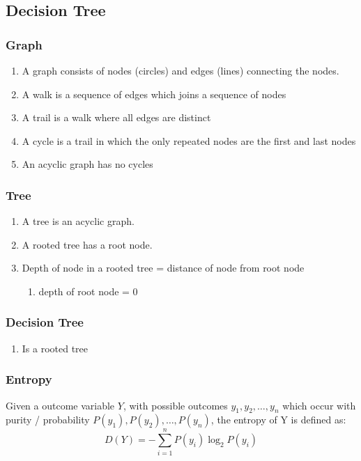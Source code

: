 \documentclass[../../dsa1101_notes.Rtex]{subfiles}\usepackage[]{graphicx}\usepackage[]{color}
\begin{document}
\subsection{Decision Tree}
\subsubsection{Graph}
\begin{enumerate}
	\item A graph consists of nodes (circles) and edges (lines) connecting the nodes.
	\item A walk is a sequence of edges which joins a sequence of nodes
	\item A trail is a walk where all edges are distinct
	\item A cycle is a trail in which the only repeated nodes are the first and last nodes
	\item An acyclic graph has no cycles
\end{enumerate}

\subsubsection{Tree}
\begin{enumerate}
	\item A tree is an acyclic graph.
	\item A rooted tree has a root node.
	\item Depth of node in a rooted tree = distance of node from root node
	\begin{enumerate}
	    \item depth of root node = 0
	\end{enumerate}
\end{enumerate}

\subsubsection{Decision Tree}
\begin{enumerate}
    \item Is a rooted tree
\end{enumerate}

\subsubsection{Entropy}
Given a outcome variable \(Y\), with possible outcomes \(y_1, y_2, \ldots, y_n\) which occur with purity / probability \(P(y_1), P(y_2), \ldots, P(y_n)\), the entropy of Y is defined as:
\[D(Y)=-\sum_{i=1}^n P(y_i)\log_2 P(y_i)\]
\end{document}
